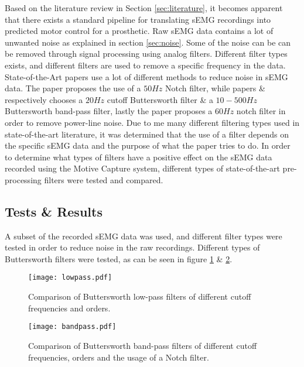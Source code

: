 \documentclass[../main.tex]{subfiles}
\begin{document}
Based on the literature review in Section \ref{sec:literature}, it becomes apparent that there exists a standard pipeline for translating sEMG recordings into predicted motor control for a prosthetic.
Raw sEMG data contains a lot of unwanted noise as explained in section \ref{sec:noise}.
Some of the noise can be can be removed through signal processing using analog filters.
Different filter types exists, and different filters are used to remove a specific frequency in the data. 
State-of-the-Art papers use a lot of different methods to reduce noise in sEMG data.
The paper \cite{multdof} proposes the use of a $50Hz$ Notch filter, while papers \cite{graspintent} \& \cite{ashirbad2022} respectively chooses a $20Hz$ cutoff Buttersworth filter \& a $10-500Hz$  Buttersworth band-pass filter, lastly the paper proposes a $60Hz$ notch filter in order to remove power-line noise.
Due to me many different filtering types used in state-of-the-art literature, it was determined that the use of a filter depends on the specific sEMG data and the purpose of what the paper tries to do.
In order to determine what types of filters have a positive effect on the sEMG data recorded using the Motive Capture system, different types of state-of-the-art pre-processing filters were tested and compared.


\subsection{Tests \& Results}

A subset of the recorded sEMG data was used, and different filter types were tested in order to reduce noise in the raw recordings.
Different types of Buttersworth filters were tested, as can be seen in figure \ref{fig:lowpass} \& \ref{fig:bandpass}.

\begin{figure}[H]
\begin{center}
\texttt{[image: lowpass.pdf]}
\caption{Comparison of Buttersworth low-pass filters of different cutoff frequencies and orders.}
\label{fig:lowpass}
\end{center}
\end{figure}
\begin{figure}[H]
\begin{center}
\texttt{[image: bandpass.pdf]}
\caption{Comparison of Buttersworth band-pass filters of different cutoff frequencies, orders and the usage of a Notch filter.}
\label{fig:bandpass}
\end{center}
\end{figure}
\end{document}
